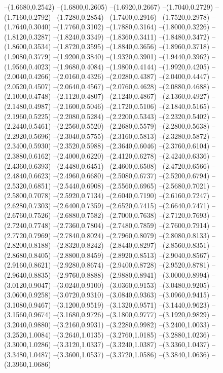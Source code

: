 {\begin{scope}
--(1.6680,0.2542)
--(1.6800,0.2605)
--(1.6920,0.2667)
--(1.7040,0.2729)
--(1.7160,0.2792)
--(1.7280,0.2854)
--(1.7400,0.2916)
--(1.7520,0.2978)
--(1.7640,0.3040)
--(1.7760,0.3102)
--(1.7880,0.3164)
--(1.8000,0.3226)
--(1.8120,0.3287)
--(1.8240,0.3349)
--(1.8360,0.3411)
--(1.8480,0.3472)
--(1.8600,0.3534)
--(1.8720,0.3595)
--(1.8840,0.3656)
--(1.8960,0.3718)
--(1.9080,0.3779)
--(1.9200,0.3840)
--(1.9320,0.3901)
--(1.9440,0.3962)
--(1.9560,0.4023)
--(1.9680,0.4084)
--(1.9800,0.4144)
--(1.9920,0.4205)
--(2.0040,0.4266)
--(2.0160,0.4326)
--(2.0280,0.4387)
--(2.0400,0.4447)
--(2.0520,0.4507)
--(2.0640,0.4567)
--(2.0760,0.4628)
--(2.0880,0.4688)
--(2.1000,0.4748)
--(2.1120,0.4807)
--(2.1240,0.4867)
--(2.1360,0.4927)
--(2.1480,0.4987)
--(2.1600,0.5046)
--(2.1720,0.5106)
--(2.1840,0.5165)
--(2.1960,0.5225)
--(2.2080,0.5284)
--(2.2200,0.5343)
--(2.2320,0.5402)
--(2.2440,0.5461)
--(2.2560,0.5520)
--(2.2680,0.5579)
--(2.2800,0.5638)
--(2.2920,0.5696)
--(2.3040,0.5755)
--(2.3160,0.5813)
--(2.3280,0.5872)
--(2.3400,0.5930)
--(2.3520,0.5988)
--(2.3640,0.6046)
--(2.3760,0.6104)
--(2.3880,0.6162)
--(2.4000,0.6220)
--(2.4120,0.6278)
--(2.4240,0.6336)
--(2.4360,0.6393)
--(2.4480,0.6451)
--(2.4600,0.6508)
--(2.4720,0.6566)
--(2.4840,0.6623)
--(2.4960,0.6680)
--(2.5080,0.6737)
--(2.5200,0.6794)
--(2.5320,0.6851)
--(2.5440,0.6908)
--(2.5560,0.6965)
--(2.5680,0.7021)
--(2.5800,0.7078)
--(2.5920,0.7134)
--(2.6040,0.7190)
--(2.6160,0.7247)
--(2.6280,0.7303)
--(2.6400,0.7359)
--(2.6520,0.7415)
--(2.6640,0.7471)
--(2.6760,0.7526)
--(2.6880,0.7582)
--(2.7000,0.7638)
--(2.7120,0.7693)
--(2.7240,0.7748)
--(2.7360,0.7804)
--(2.7480,0.7859)
--(2.7600,0.7914)
--(2.7720,0.7969)
--(2.7840,0.8024)
--(2.7960,0.8079)
--(2.8080,0.8133)
--(2.8200,0.8188)
--(2.8320,0.8242)
--(2.8440,0.8297)
--(2.8560,0.8351)
--(2.8680,0.8405)
--(2.8800,0.8459)
--(2.8920,0.8513)
--(2.9040,0.8567)
--(2.9160,0.8621)
--(2.9280,0.8674)
--(2.9400,0.8728)
--(2.9520,0.8781)
--(2.9640,0.8835)
--(2.9760,0.8888)
--(2.9880,0.8941)
--(3.0000,0.8994)
--(3.0120,0.9047)
--(3.0240,0.9100)
--(3.0360,0.9153)
--(3.0480,0.9205)
--(3.0600,0.9258)
--(3.0720,0.9310)
--(3.0840,0.9363)
--(3.0960,0.9415)
--(3.1080,0.9467)
--(3.1200,0.9519)
--(3.1320,0.9571)
--(3.1440,0.9623)
--(3.1560,0.9674)
--(3.1680,0.9726)
--(3.1800,0.9777)
--(3.1920,0.9829)
--(3.2040,0.9880)
--(3.2160,0.9931)
--(3.2280,0.9982)
--(3.2400,1.0033)
--(3.2520,1.0084)
--(3.2640,1.0135)
--(3.2760,1.0185)
--(3.2880,1.0236)
--(3.3000,1.0286)
--(3.3120,1.0337)
--(3.3240,1.0387)
--(3.3360,1.0437)
--(3.3480,1.0487)
--(3.3600,1.0537)
--(3.3720,1.0586)
--(3.3840,1.0636)
--(3.3960,1.0686)

\end{scope}}
